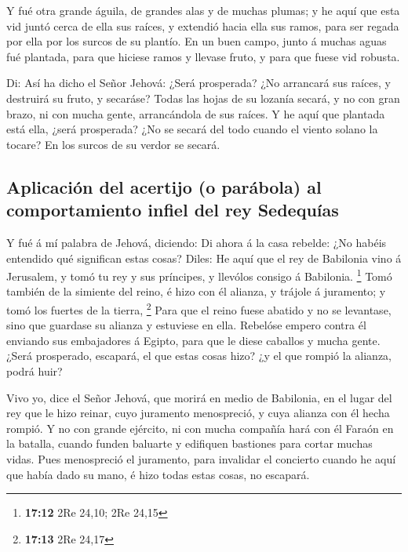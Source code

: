  Y fué otra grande águila, de grandes alas y de muchas
plumas; y he aquí que esta vid juntó cerca de ella sus raíces, y
extendió hacia ella sus ramos, para ser regada por ella por los surcos
de su plantío.  En un buen campo, junto á muchas aguas fué
plantada, para que hiciese ramos y llevase fruto, y para que fuese vid
robusta.

 Di: Así ha dicho el Señor Jehová: ¿Será prosperada? ¿No
arrancará sus raíces, y destruirá su fruto, y secaráse? Todas las hojas
de su lozanía secará, y no con gran brazo, ni con mucha gente,
arrancándola de sus raíces.  Y he aquí que plantada está
ella, ¿será prosperada? ¿No se secará del todo cuando el viento solano
la tocare? En los surcos de su verdor se secará.

\hypertarget{aplicaciuxf3n-del-acertijo-o-paruxe1bola-al-comportamiento-infiel-del-rey-sedequuxedas}{%
\subsection{Aplicación del acertijo (o parábola) al comportamiento
infiel del rey
Sedequías}\label{aplicaciuxf3n-del-acertijo-o-paruxe1bola-al-comportamiento-infiel-del-rey-sedequuxedas}}

 Y fué á mí palabra de Jehová, diciendo: 
Di ahora á la casa rebelde: ¿No habéis entendido qué significan estas
cosas? Diles: He aquí que el rey de Babilonia vino á Jerusalem, y tomó
tu rey y sus príncipes, y llevólos consigo á Babilonia. \footnote{\textbf{17:12}
  2Re 24,10; 2Re 24,15}  Tomó también de la simiente del
reino, é hizo con él alianza, y trájole á juramento; y tomó los fuertes
de la tierra, \footnote{\textbf{17:13} 2Re 24,17}  Para
que el reino fuese abatido y no se levantase, sino que guardase su
alianza y estuviese en ella.  Rebelóse empero contra él
enviando sus embajadores á Egipto, para que le diese caballos y mucha
gente. ¿Será prosperado, escapará, el que estas cosas hizo? ¿y el que
rompió la alianza, podrá huir?

 Vivo yo, dice el Señor Jehová, que morirá en medio de
Babilonia, en el lugar del rey que le hizo reinar, cuyo juramento
menospreció, y cuya alianza con él hecha rompió.  Y no
con grande ejército, ni con mucha compañía hará con él Faraón en la
batalla, cuando funden baluarte y edifiquen bastiones para cortar muchas
vidas.  Pues menospreció el juramento, para invalidar el
concierto cuando he aquí que había dado su mano, é hizo todas estas
cosas, no escapará.

